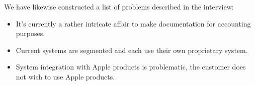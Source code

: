 We have likewise constructed a list of problems described in the interview:
\begin{itemize}[noitemsep]
    \item It's currently a rather intricate affair to make documentation for accounting purposes.
    \item Current systems are segmented and each use their own proprietary system.
    \item System integration with Apple products is problematic, the customer does not wish to use Apple products. %
\end{itemize}

